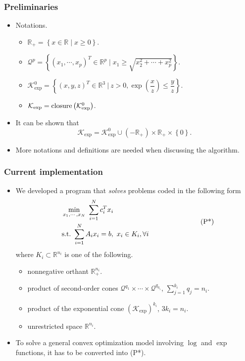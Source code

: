 \documentclass{beamer}
\begin{document}
\begin{frame}
	\frametitle{Preliminaries}
	\begin{itemize}
		\item Notations.
		\begin{itemize}
			\item $\mathbb{R}_+ = \left\{x\in \mathbb{R} \mid x\geq 0  \right\}$. \\[1ex]
			\item $\mathcal{Q}^p = \left\{\left(x_1, \cdots, x_p\right)^T \in \mathbb{R}^p \mid x_1 \geq \sqrt{x_2^2+\cdots+x_p^2}\right\}$. \\[1ex]
			\item $\mathcal{K}^0_{\exp} = \left\{ \left(x,y,z\right)^T\in \mathbb{R}^3 \ \rvert\ z>0, \exp\left(\dfrac{x}{z} \right)\leq\dfrac{y}{z} \right\}$. \\[1ex]
			\item $\mathcal{K}_{\exp}=\textnormal{closure} \left(\mathcal{K}^0_{\exp} \right)$.\\[2ex]
		\end{itemize}
	\item It can be shown that 
	\[\mathcal{K}_{\exp} = \mathcal{K}^0_{\exp} \cup \left(-\mathbb{R}_+\right)\times \mathbb{R}_+ \times \left\{0\right\}. \]
	\item More notations and definitions are needed when discussing the algorithm.
	\end{itemize}
\end{frame}

\begin{frame}
	\frametitle{Current implementation}
	\begin{itemize}
		\item We developed a program that \textit{solves} problems coded in the following form
		\begin{align*}
		\begin{split}
		\quad &\min_{x_1, \cdots, x_N}\,\, \sum_{i=1}^N c_i^Tx_i\\
		& \text{s.t.}\,\, \sum_{i=1}^N A_i x_i = b,\ x_i \in K_i, \forall i
		\end{split} \quad\quad\quad\quad\quad\quad\quad\,\,\, \textnormal{(P*)}
		\end{align*}
		where $K_i\subset \mathbb{R}^{n_i}$ is one of the following.
		\begin{itemize}
			\item nonnegative orthant $\mathbb{R}_+^{n_i}$.
			\item product of second-order cones $\mathcal{Q}^{q_1}\times \cdots \times \mathcal{Q}^{q_{k_i}}$, $\sum_{j=1}^{k_i} q_j = n_i$.
			\item product of the exponential cone  $\left(\mathcal{K}_{\exp}\right)^{k_i}$, $3k_i = n_i$.
			\item unrestricted space $\mathbb{R}^{n_i}$.
		\end{itemize}
		\item To solve a general convex optimization model involving $\log$ and $\exp$ functions, it has to be converted into (P*).
	\end{itemize}
\end{frame}
\end{document}
